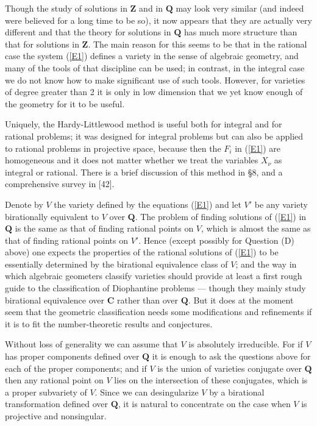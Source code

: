 \documentclass[12pt]{article}
\def\bC{{\mathbf C}}
\def\bQ{{\mathbf Q}}
\def\bZ{{\mathbf Z}}
\begin{document}
Though the study of solutions in $\bZ$ and in $\bQ$ may look very similar (and
indeed were believed for a long time to be so), it now appears that they are
actually very different and that the theory for solutions in $\bQ$ has much
more structure than that for solutions in $\bZ$. The main reason for this seems
to be that in the rational case the system (\ref{E1}) defines a variety in
the sense of algebraic geometry, and many of the tools of that discipline can
be used; in contrast, in the integral case we do not know how to make
significant use of such
tools. However, for varieties of degree greater than 2 it is only
in low dimension that we yet know enough of the geometry for it to be useful.

Uniquely, the Hardy-Littlewood method is useful both for integral and for
rational problems; it was designed for integral
problems but can also be applied to rational problems in projective space,
because then the $F_i$ in (\ref{E1}) are homogeneous and it does not
matter whether we treat the variables $X_\nu$ as integral or rational. There
is a brief discussion of this method in \S8, and a comprehensive
survey in [42].

Denote by $V$ the variety defined by the equations (\ref{E1}) and let $V'$
be any variety birationally equivalent to $V$ over $\bQ$. The problem of
finding solutions of (\ref{E1}) in $\bQ$ is the same as that of finding
rational points on $V$, which is almost the same as that of 
finding rational points on $V'$. Hence (except possibly for Question (D) above)
one expects the properties of the rational solutions of
(\ref{E1}) to be essentially determined by the birational equivalence class
of $V$; and the way in which algebraic geometers classify varieties should
provide at least a first rough guide to the classification of Diophantine
problems --- though they mainly study birational equivalence over $\bC$
rather than over $\bQ$. But it does at the moment seem that the
geometric classification needs some
modifications and refinements if it is to fit the number-theoretic results
and conjectures.

Without loss of
generality we can assume that $V$ is absolutely irreducible. For if $V$ has
proper components defined over $\bQ$ it is enough to ask the questions above
for each of the proper components; and if $V$ is the union of varieties
conjugate over $\bQ$ then any rational point on $V$ lies on the intersection
of these conjugates, which is a proper subvariety of $V$. Since we can
desingularize $V$ by a birational transformation defined over $\bQ$,
it is natural to concentrate on the case when $V$ is
projective and nonsingular.
\end{document}
